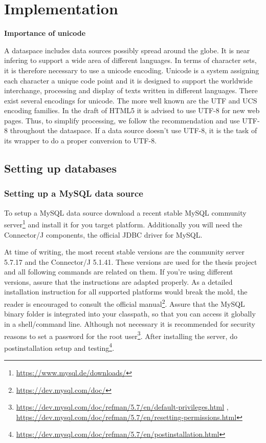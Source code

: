 \chapter{Implementation}

\textbf{Importance of unicode}

A dataspace includes data sources possibly spread around the globe. It is near infering to support a wide area of different languages. In terms of character sets, it is therefore necessary to use a unicode encoding.
Unicode is a system assigning each character a unique code point and it is designed to support the worldwide interchange, processing and display of texts written in different languages\cite{UnicodeStandard}.\newline
There exist several encodings for unicode. The more well known are the UTF and UCS encoding families. In the draft of HTML5 it is advised to use UTF-8 for new web pages\cite{HTML5Rec}. 
Thus, to simplify processing, we follow the recommendation and use UTF-8 throughout the dataspace. If a data source doesn't use UTF-8, it is the task of its wrapper to do a proper conversion to UTF-8.

\section{Setting up databases}


\subsection{Setting up a MySQL data source}

To setup a MySQL data source download a recent stable MySQL community server\footnote{\url{https://www.mysql.de/downloads/}} 
and install it for you target platform. Additionally you will need the Connector/J components, the official JDBC driver for MySQL. 

At time of writing, the most recent stable versions are the community server 5.7.17 and the Connector/J 5.1.41. These versions are used for the thesis project and all following commands are related on them. If you're using 
different versions, assure that the instructions are adapted properly. As a detailed installation instruction for all supported platforms would break the mold, the reader is encouraged to consult the official 
manual\footnote{\url{https://dev.mysql.com/doc/}}. 
Assure that the MySQL binary folder is integrated into your classpath, so that you can access it globally in a shell/command line. Although not necessary it is recommended for security reasons 
to set a password for the root user\footnote{\url{https://dev.mysql.com/doc/refman/5.7/en/default-privileges.html} , \url{https://dev.mysql.com/doc/refman/5.7/en/resetting-permissions.html}}. 
After installing the server, do postinstallation setup and testing\footnote{\url{https://dev.mysql.com/doc/refman/5.7/en/postinstallation.html}}. 

